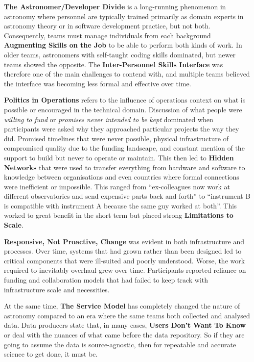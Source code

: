 \documentclass[11pt,twoside]{article}
\begin{document}
\textbf{The Astronomer/Developer Divide} is a long-running phenomenon in astronomy where personnel are typically trained primarily as domain experts in astronomy theory or in software development practice, but not both. Consequently, teams must manage individuals from each background \textbf{Augmenting Skills on the Job} to be able to perform both kinds of work. In older teams, astronomers with self-taught coding skills dominated, but newer teams showed the opposite. The \textbf{Inter-Personnel Skills Interface} was therefore one of the main challenges to contend with, and multiple teams believed the interface was becoming less formal and effective over time.

\textbf{Politics in Operations} refers to the influence of operations context on what is possible or encouraged in the technical domain. Discussion of what people were \textit{willing to fund} or \textit{promises never intended to be kept} dominated when participants were asked why they approached particular projects the way they did. Promised timelines that were never possible, physical infrastructure of compromised quality due to the funding landscape, and constant mention of the support to build but never to operate or maintain. This then led to \textbf{Hidden Networks} that were used to transfer everything from hardware and software to knowledge between organisations and even countries where formal connections were inefficient or impossible. This ranged from ``ex-colleagues now work at different observatories and send expensive parts back and forth'' to ``instrument B is compatible with instrument A because the same guy worked at both''. This worked to great benefit in the short term but placed strong \textbf{Limitations to Scale}.

\textbf{Responsive, Not Proactive, Change} was evident in both infrastructure and processes. Over time, systems that had grown rather than been designed led to critical components that were ill-suited and poorly understood. Worse, the work required to inevitably overhaul grew over time. Participants reported reliance on funding and collaboration models that had failed to keep track with infrastructure scale and necessities.

At the same time, \textbf{The Service Model} has completely changed the nature of astronomy compared to an era where the same teams both collected and analysed data. Data producers state that, in many cases, \textbf{Users Don't Want To Know} or deal with the nuances of what came before the data repository. So if they are going to assume the data is source-agnostic, then for repeatable and accurate science to get done, it must be.
\end{document}
